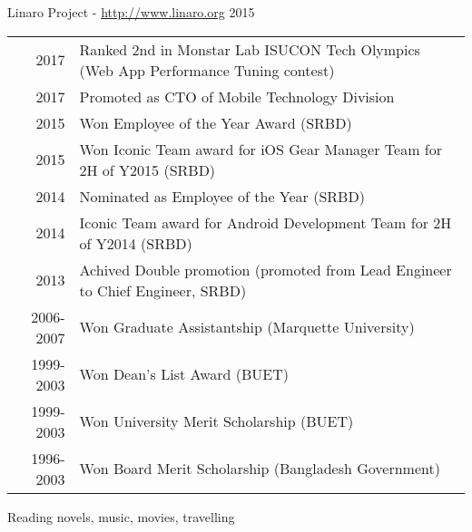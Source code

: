 \documentclass[10pt,a4paper]{article} %
\begin{document}

\spacedhrule{1.6em}{-0.4em} %



\headedsubsection
{Linaro Project - \href{http://www.linaro.org}{http://www.linaro.org}}
{2015}
{}


\spacedhrule{1.6em}{-0.4em} %

\begin{longtable}{rl}
2017	   &    Ranked 2nd in Monstar Lab ISUCON Tech Olympics (Web App Performance Tuning contest) \\
2017   &     Promoted as CTO of Mobile Technology Division \\
2015	   &    Won Employee of the Year Award (SRBD)\\
2015	   &    Won Iconic Team award for iOS Gear Manager Team for 2H of Y2015 (SRBD)\\
2014   &    Nominated as Employee of the Year (SRBD)\\
2014	   &    Iconic Team award for Android Development Team for 2H of Y2014 (SRBD)\\
2013   &    Achived Double promotion (promoted from Lead Engineer to Chief Engineer, SRBD) \\
2006-2007 &    Won Graduate Assistantship (Marquette University)\\
1999-2003 &    Won Dean's List Award (BUET)\\
1999-2003 &    Won University Merit Scholarship (BUET)\\
1996-2003 &    Won Board Merit Scholarship (Bangladesh Government)
\end{longtable}



{Reading novels, music, movies, travelling}
\end{document}
